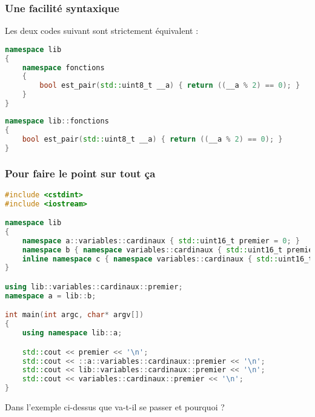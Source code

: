 \documentclass{cppcourses}
\begin{document}
\begin{frame}[fragile]

\frametitle{Une facilité syntaxique}

Les deux codes suivant sont strictement équivalent :

\begin{lstlisting}[language = c++]
namespace lib
{
    namespace fonctions
    {
        bool est_pair(std::uint8_t __a) { return ((__a % 2) == 0); }
    }
}
\end{lstlisting}

\begin{lstlisting}[language = c++]
namespace lib::fonctions
{
    bool est_pair(std::uint8_t __a) { return ((__a % 2) == 0); }
}
\end{lstlisting}

\end{frame}

\begin{frame}[fragile]

\frametitle{Pour faire le point sur tout ça}

\begin{example}

\begin{lstlisting}[language = c++]
#include <cstdint>
#include <iostream>

namespace lib
{
    namespace a::variables::cardinaux { std::uint16_t premier = 0; }
    namespace b { namespace variables::cardinaux { std::uint16_t premier = 1; } }
    inline namespace c { namespace variables::cardinaux { std::uint16_t premier = 2; } }
}

using lib::variables::cardinaux::premier;
namespace a = lib::b;

int main(int argc, char* argv[])
{
    using namespace lib::a;

    std::cout << premier << '\n';
    std::cout << ::a::variables::cardinaux::premier << '\n';
    std::cout << lib::variables::cardinaux::premier << '\n';
    std::cout << variables::cardinaux::premier << '\n';
}
\end{lstlisting}

Dans l'exemple ci-dessus que va-t-il se passer et pourquoi ?


\end{example}

\end{frame}
\end{document}
